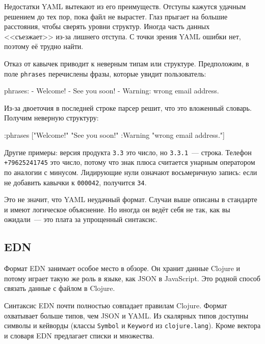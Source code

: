 Недостатки YAML вытекают из его преимуществ. Отступы кажутся удачным решением до
тех пор, пока файл не вырастет. Глаз прыгает на большие расстояния, чтобы
сверять уровни структур. Иногда часть данных <<съезжает>> из-за лишнего
отступа. С точки зрения YAML ошибки нет, поэтому её трудно найти.

Отказ от кавычек приводит к неверным типам или структуре. Предположим, в
поле \verb|phrases| перечислены фразы, которые увидит пользователь:

\begin{english}
  \begin{yaml}
phrases:
  - Welcome!
  - See you soon!
  - Warning: wrong email address.
  \end{yaml}
\end{english}

Из-за двоеточия в последней строке парсер решит, что это вложенный
словарь. Получим неверную структуру:

\begin{english}
  \begin{clojure}
{:phrases
 ["Welcome!"
  "See you soon!"
  {:Warning "wrong email address."}]}
  \end{clojure}
\end{english}

Другие примеры: версия продукта \verb|3.3| это число, но \verb|3.3.1|~---
строка. Телефон \verb|+79625241745| это число, потому что знак плюса считается
унарным оператором по аналогии с минусом. Лидирующие нули означают восьмеричную
запись: если не добавить кавычки к \verb|000042|, получится \verb|34|.

Это не значит, что YAML неудачный формат. Случаи выше описаны в стандарте и
имеют логическое объяснение. Но иногда он ведёт себя не так, как вы ожидали~---
это плата за упрощенный синтаксис.

\subsection{EDN}


Формат EDN занимает особое место в обзоре. Он хранит данные Clojure и потому
играет такую же роль в языке, как JSON в JavaScript. Это родной способ связать
данные с файлом в Clojure.

Синтаксис EDN почти полностью совпадает правилам Clojure. Формат охватывает
больше типов, чем JSON и YAML. Из скалярных типов доступны символы и
кейворды (классы \verb|Symbol| и \verb|Keyword| из
\verb|clojure.lang|). Кроме вектора и словаря EDN предлагает списки и
множества.

